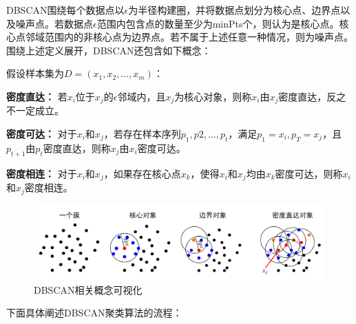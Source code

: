 DBSCAN围绕每个数据点以$\epsilon$为半径构建圈，并将数据点划分为核心点、边界点以及噪声点。若数据点$ \epsilon $范围内包含点的数量至少为minPts个，则认为是核心点。核心点邻域范围内的非核心点为边界点。若不属于上述任意一种情况，则为噪声点。围绕上述定义展开，DBSCAN还包含如下概念：

假设样本集为$D=(x_1,x_2,...,x_m)$：
\begin{compactitem}
	\item \textbf{密度直达：} 若$ x_i $位于$ x_j $的$ \epsilon$邻域内，且$ x_j $为核心对象，则称$ x_i $由$ x_j $密度直达，反之不一定成立。
	\item \textbf{密度可达：} 对于$ x_i $和$ x_j $，若存在样本序列$ p_1,p2,...,p_t $，满足$ p_1=x_i,p_T=x_j $，且$ p_{t+1} $由$ p_t $密度直达，则称$ x_j $由$ x_i $密度可达。
	\item \textbf{密度相连：} 对于$ x_i $和$ x_j $，如果存在核心点$ x_k $，使得$ x_i $和$ x_j $均由$ x_k $密度可达，则称$ x_i $和$ x_j $密度相连。
\end{compactitem}

\begin{figure}[htbp] %
	\centering
	\includegraphics[scale=0.18 ]{img/dbscan-pre.png}
	\caption{DBSCAN相关概念可视化}
	\label{s4-dbscanpre}
\end{figure}

下面具体阐述DBSCAN聚类算法的流程：

